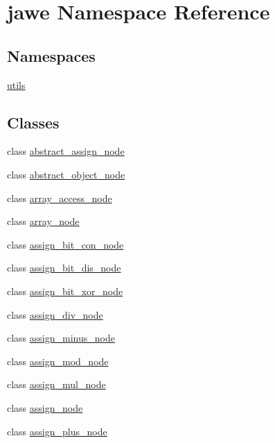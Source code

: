 \hypertarget{namespacejawe}{}\section{jawe Namespace Reference}
\label{namespacejawe}
\subsection*{Namespaces}
\begin{DoxyCompactItemize}
\item 
 \hyperlink{namespacejawe_1_1utils}{utils}
\end{DoxyCompactItemize}
\subsection*{Classes}
\begin{DoxyCompactItemize}
\item 
class \hyperlink{classjawe_1_1abstract__assign__node}{abstract\+\_\+assign\+\_\+node}
\item 
class \hyperlink{classjawe_1_1abstract__object__node}{abstract\+\_\+object\+\_\+node}
\item 
class \hyperlink{classjawe_1_1array__access__node}{array\+\_\+access\+\_\+node}
\item 
class \hyperlink{classjawe_1_1array__node}{array\+\_\+node}
\item 
class \hyperlink{classjawe_1_1assign__bit__con__node}{assign\+\_\+bit\+\_\+con\+\_\+node}
\item 
class \hyperlink{classjawe_1_1assign__bit__dis__node}{assign\+\_\+bit\+\_\+dis\+\_\+node}
\item 
class \hyperlink{classjawe_1_1assign__bit__xor__node}{assign\+\_\+bit\+\_\+xor\+\_\+node}
\item 
class \hyperlink{classjawe_1_1assign__div__node}{assign\+\_\+div\+\_\+node}
\item 
class \hyperlink{classjawe_1_1assign__minus__node}{assign\+\_\+minus\+\_\+node}
\item 
class \hyperlink{classjawe_1_1assign__mod__node}{assign\+\_\+mod\+\_\+node}
\item 
class \hyperlink{classjawe_1_1assign__mul__node}{assign\+\_\+mul\+\_\+node}
\item 
class \hyperlink{classjawe_1_1assign__node}{assign\+\_\+node}
\item 
class \hyperlink{classjawe_1_1assign__plus__node}{assign\+\_\+plus\+\_\+node}
\item 

\end{DoxyCompactItemize}
